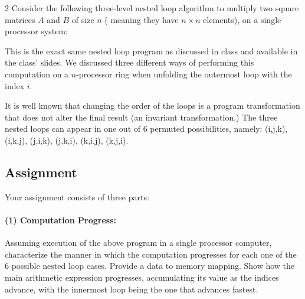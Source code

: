 \documentclass[12pt]{article}
\begin{document}
\begin{multicols}{2}
Consider the following three-level nested loop algorithm to multiply two square matrices $A$ and $B$ of size $n$ ( meaning they have $n \times n$ elements), on a single processor system:

\vspace{20pt}
\begin{algorithm}[H] %
  \footnotesize
  \SetAlgoLined

  \caption{\small Matrix multiplication}%
  \label{mat-mul}
\end{algorithm}      
\vspace{25pt}      

This is the exact same nested loop program as discussed in class and available in the class' slides. We discussed three different ways of performing this computation on a \mbox{$n$-processor} ring when unfolding the outermost loop with the index $i$.

It is well known that changing the order of the loops is a program transformation that does not alter the final result (an invariant transformation.) The three nested loops can appear in one out of 6 permuted possibilities, namely: (i,j,k), (i,k,j), (j,i,k), (j,k,i), (k,i,j), (k,j,i).

\subsection*{Assignment}
Your assignment consists of three parts: 

\paragraph{(1) Computation Progress:} Assuming execution of the above program in a single processor computer, characterize the manner in which the computation progresses for each one of the 6 possible nested loop cases.
Provide a data to memory mapping. Show how the main arithmetic expression progresses, accumulating its value as the indices advance, with the innermost loop being the one that advances fastest. 


\end{multicols}
\end{document}

